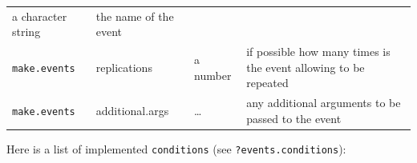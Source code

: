 \documentclass[
]{book}
\begin{document}
\begin{longtable}[]{@{}llll@{}}
\begin{minipage}[t]{0.14\columnwidth}
a character string\strut
\end{minipage} & \begin{minipage}[t]{0.33\columnwidth}\raggedright
the name of the event\strut
\end{minipage}\tabularnewline
\begin{minipage}[t]{0.19\columnwidth}\raggedright
\texttt{make.events}\strut
\end{minipage} & \begin{minipage}[t]{0.23\columnwidth}\raggedright
replications\strut
\end{minipage} & \begin{minipage}[t]{0.14\columnwidth}\raggedright
a number\strut
\end{minipage} & \begin{minipage}[t]{0.33\columnwidth}\raggedright
if possible how many times is the event allowing to be repeated\strut
\end{minipage}\tabularnewline
\begin{minipage}[t]{0.19\columnwidth}\raggedright
\texttt{make.events}\strut
\end{minipage} & \begin{minipage}[t]{0.23\columnwidth}\raggedright
additional.args\strut
\end{minipage} & \begin{minipage}[t]{0.14\columnwidth}\raggedright
\ldots{}\strut
\end{minipage} & \begin{minipage}[t]{0.33\columnwidth}\raggedright
any additional arguments to be passed to the event\strut
\end{minipage}\tabularnewline
\bottomrule
\end{longtable}

Here is a list of implemented \texttt{conditions} (see \texttt{?events.conditions}):
\end{document}
